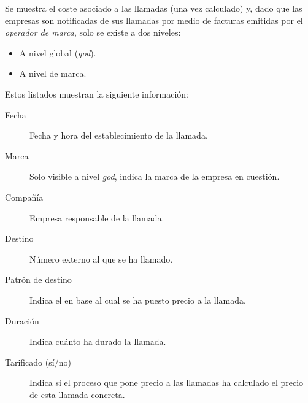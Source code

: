 \documentclass[letterpaper,10pt,spanish]{sphinxmanual}
\begin{document}
Se muestra el coste asociado a las llamadas (una vez calculado) y, dado que las empresas son notificadas de sus llamadas por medio de facturas emitidas por el \emph{operador de marca}, solo se existe a dos niveles:
\begin{itemize}
\item {} 
A nivel global (\emph{god}).

\item {} 
A nivel de marca.

\end{itemize}

Estos listados muestran la siguiente información:
\begin{description}
\item[{Fecha}] \leavevmode{}\label{billing_and_invoices/billable_calls:term-fecha}
Fecha y hora del establecimiento de la llamada.

\item[{Marca}] \leavevmode{}\label{billing_and_invoices/billable_calls:term-marca}
Solo visible a nivel \emph{god}, indica la marca de la empresa en cuestión.

\item[{Compañía}] \leavevmode{}\label{billing_and_invoices/billable_calls:term-compania}
Empresa responsable de la llamada.

\item[{Destino}] \leavevmode{}\label{billing_and_invoices/billable_calls:term-destino}
Número externo al que se ha llamado.

\item[{Patrón de destino}] \leavevmode{}\label{billing_and_invoices/billable_calls:term-patron-de-destino}
Indica el {\hyperref[external_outgoing_calls/noplan_nocall:price\string-pattern]{}} en base al cual se ha puesto precio a la llamada.

\item[{Duración}] \leavevmode{}\label{billing_and_invoices/billable_calls:term-duracion}
Indica cuánto ha durado la llamada.

\item[{Tarificado (sí/no)}] \leavevmode{}\label{billing_and_invoices/billable_calls:term-tarificado-si-no}
Indica si el proceso que pone precio a las llamadas ha calculado el precio de esta llamada concreta.


\end{description}
\end{document}
